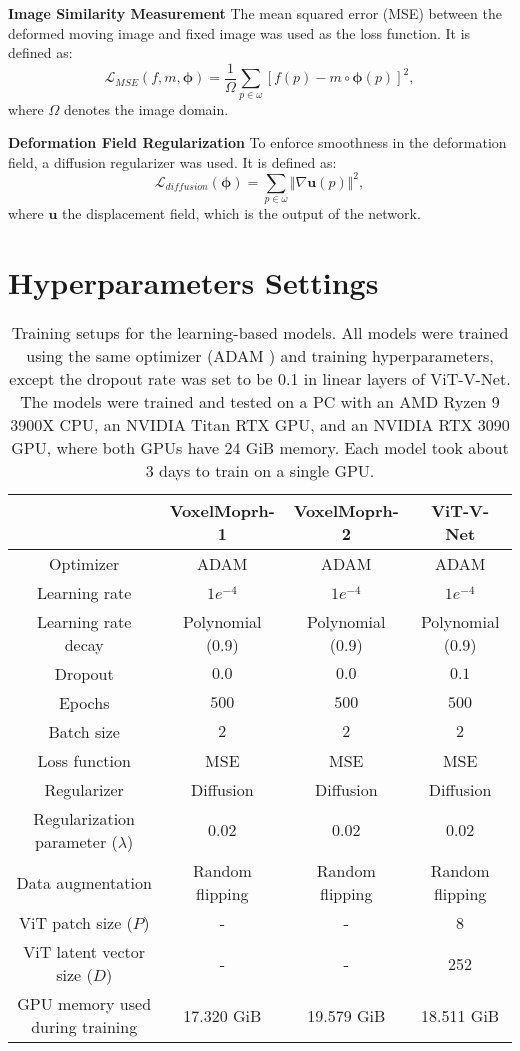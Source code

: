 \documentclass{midl}
\begin{document}
\noindent\textbf{Image Similarity Measurement}
The mean squared error (MSE) between the deformed moving image and fixed image was used as the loss function. It is defined as:
\begin{equation}
    \mathcal{L}_{MSE}(f, m, \mathbf{\phi}) =\frac{1}{\Omega}\sum_{p\in\omega}\left[f(p)-m\circ\mathbf{\phi}(p)\right]^2,
\end{equation}
where $\Omega$ denotes the image domain.

\noindent\textbf{Deformation Field Regularization}
To enforce smoothness in the deformation field, a diffusion regularizer was used. It is defined as:
\begin{equation}
    \mathcal{L}_{diffusion}(\mathbf{\phi}) =\sum_{p\in\omega}\Vert\nabla\mathbf{u}(p)\Vert^2,
\end{equation}
where $\mathbf{u}$ the displacement field, which is the output of the network.

\section{Hyperparameters Settings}
\label{hyper}
\begin{table}[!hbp]
\centering
\footnotesize
    \begin{tabular}{ c | c c c}
 \hline
  & VoxelMoprh-1 & VoxelMoprh-2 & ViT-V-Net\\
 \hline
 Optimizer & ADAM & ADAM & ADAM \\
 \hline
 Learning rate& $1e^{-4}$ & $1e^{-4}$ & $1e^{-4}$\\
  \hline
 Learning rate decay & Polynomial (0.9) & Polynomial (0.9) & Polynomial (0.9)\\
  \hline
Dropout & $0.0$ & $0.0$ & $\mathbf{0.1}$\\
  \hline
 Epochs & $500$ & $500$ & $500$\\
 \hline
 Batch size  & $2$ & $2$ & $2$\\
 \hline
 Loss function & MSE & MSE & MSE \\
 \hline
 Regularizer & Diffusion & Diffusion & Diffusion \\
 \hline
 Regularization parameter ($\lambda$)  & $0.02$ & $0.02$ & $0.02$\\
 \hline
 Data augmentation  & Random flipping & Random flipping & Random flipping\\
 \hline
 ViT patch size ($P$)  & - & - & 8\\
 \hline
 ViT latent vector size ($D$)  & - & - & 252\\
 \hline
 GPU memory used during training  & 17.320 GiB & 19.579 GiB & 18.511 GiB\\
 \hline
\end{tabular}
\captionsetup{justification=centering}
\caption{Training setups for the learning-based models. All models were trained using the same optimizer (ADAM \cite{kingma2014adam}) and training hyperparameters, except the dropout rate was set to be 0.1 in linear layers of ViT-V-Net. The models were trained and tested on a PC with an AMD Ryzen 9 3900X CPU, an NVIDIA Titan RTX GPU, and an NVIDIA RTX 3090 GPU, where both GPUs have 24 GiB memory. Each model took about 3 days to train on a single GPU.}\label{table_hyper}
\end{table}
\end{document}
